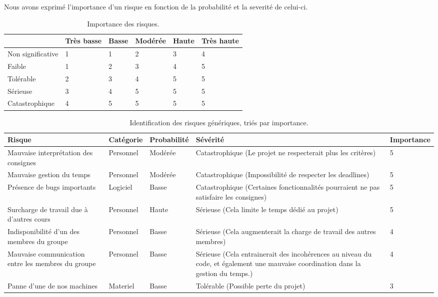 \documentclass[]{article}
\begin{document}
Nous avons exprimé l'importance d'un risque en fonction de la probabilité et la severité de celui-ci.
\begin{table}[!htbp]
\begin{center}
\begin{tabular}{|p{3cm}|p{1.5cm}|p{1.5cm}|p{1.5cm}|p{1.5cm}|p{1.5cm}|}
\hline
 & Très basse & Basse & Modérée & Haute & Très haute \\
\hline\hline
Non significative & 1 & 1 & 2 & 3 & 4 \\
\hline
Faible & 1 & 2 & 3 & 4 & 5 \\
\hline
Tolérable & 2 & 3 & 4 & 5 & 5 \\
\hline
Sérieuse & 3 & 4 & 5 & 5 & 5 \\
\hline
Catastrophique & 4 & 5 & 5 & 5 & 5 \\
\hline
\end{tabular}
\end{center}
   \caption{Importance des risques.}
   \label{tab:importance}
\end{table}
\begin{table}[!htbp]
\begin{center}
\begin{tabular}{|p{3cm}|p{2.5cm}||p{3cm}|p{4cm}|p{1.5cm}|}
\hline
\textbf{Risque} & Catégorie & Probabilité & Sévérité & Importance\\
\hline\hline
Mauvaise interprétation des consignes & Personnel & Modérée &  Catastrophique (Le projet ne respecterait plus les critères) & 5\\
\hline
Mauvaise gestion du temps & Personnel & Modérée & Catastrophique (Impossibilité de respecter les deadlines) & 5\\
\hline
Présence de bugs importants & Logiciel & Basse &  Catastrophique (Certaines fonctionnalités pourraient ne pas satisfaire les consignes) & 5\\
\hline
Surcharge de travail due à d'autres cours & Personnel & Haute &  Sérieuse (Cela limite le temps dédié au projet) & 5\\
\hline
Indisponibilité d'un des membres du groupe & Personnel & Basse &  Sérieuse (Cela augmenterait la charge de travail des autres membres) & 4\\
\hline

Mauvaise communication entre les membres du groupe& Personnel & Basse &  Sérieuse (Cela entrainerait des incohérences au niveau du code, et également une mauvaise coordination dans la gestion du temps.) & 4\\
\hline
Panne d'une de nos machines & Materiel & Basse &  Tolérable (Possible perte du projet) & 3\\
\hline



\end{tabular}
\end{center}
   \caption{Identification des risques génériques, triés par importance.}
   \label{tab:risquesgeneriques}
\end{table}
\end{document}
